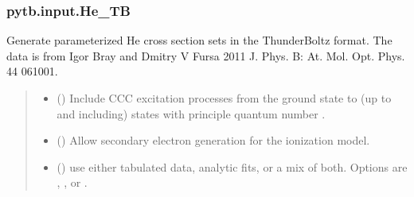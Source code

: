 \documentclass[letterpaper,10pt,english,openany,oneside]{sphinxmanual}
\begin{document}
\subsubsection{pytb.input.He\_TB}
\label{\detokenize{api/pytb.input.He_TB:pytb-input-he-tb}}\label{\detokenize{api/pytb.input.He_TB::doc}}

\begin{fulllineitems}
\label{\detokenize{api/pytb.input.He_TB:pytb.input.He_TB}}
\pysigstartsignatures
{}
\pysigstopsignatures
\sphinxAtStartPar
Generate parameterized He cross section sets in the ThunderBoltz format.
The data is from Igor Bray and Dmitry V Fursa 2011
J. Phys. B: At. Mol. Opt. Phys. 44 061001.
\begin{quote}\begin{description}
\begin{itemize}
\item {} 
\sphinxAtStartPar
{} () \textendash{} Include CCC excitation processes from the ground state to
(up to and including) states with principle quantum number .

\item {} 
\sphinxAtStartPar
{} () \textendash{} Allow secondary electron generation for the ionization model.

\item {} 
\sphinxAtStartPar
{} () \textendash{} use either tabulated data, analytic fits,
or a mix of both. Options are , , or .


\end{itemize}
\end{description}
\end{quote}
\end{fulllineitems}
\end{document}
